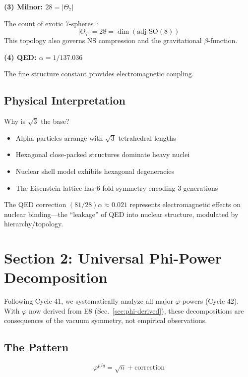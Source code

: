 \documentclass[aps,prd,twocolumn,superscriptaddress,floatfix,nofootinbib]{revtex4-2}
\theoremstyle{definition}
\theoremstyle{remark}
\newcommand{\vp}{\varphi}
\newcommand{\Th}{\Theta}
\begin{document}
\textbf{(3) Milnor: $28 = |\Th_7|$}

The count of exotic 7-spheres~\cite{milnor}:
\begin{equation}
|\Th_7| = 28 = \dim(\text{adj SO}(8))
\end{equation}
This topology also governs NS compression and the gravitational $\beta$-function.

\textbf{(4) QED: $\alpha = 1/137.036$}

The fine structure constant provides electromagnetic coupling.

\subsection{Physical Interpretation}

Why is $\sqrt{3}$ the base?

\begin{itemize}
\item Alpha particles arrange with $\sqrt{3}$ tetrahedral lengths
\item Hexagonal close-packed structures dominate heavy nuclei
\item Nuclear shell model exhibits hexagonal degeneracies
\item The Eisenstein lattice has 6-fold symmetry encoding 3 generations
\end{itemize}

The QED correction $(81/28)\alpha \approx 0.021$ represents electromagnetic effects on nuclear binding---the ``leakage'' of QED into nuclear structure, modulated by hierarchy/topology.

\section{Section 2: Universal Phi-Power Decomposition}
\label{sec:sqrt-n}

Following Cycle 41, we systematically analyze all major $\vp$-powers (Cycle 42). With $\vp$ now derived from E8 (Sec.~\ref{sec:phi-derived}), these decompositions are consequences of the vacuum symmetry, not empirical observations.

\subsection{The Pattern}

\begin{equation}
\boxed{\vp^{p/q} = \sqrt{n} + \text{correction}}
\end{equation}
\end{document}
